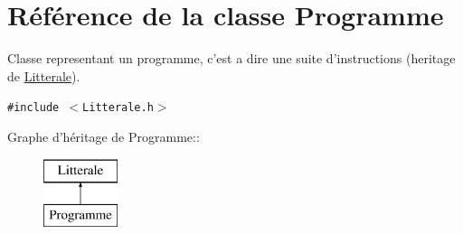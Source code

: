\hypertarget{class_programme}{
\section{Référence de la classe Programme}
\label{class_programme}
}
Classe representant un programme, c'est a dire une suite d'instructions (heritage de \hyperlink{class_litterale}{Litterale}).  


{\tt \#include $<$Litterale.h$>$}

Graphe d'héritage de Programme::\begin{figure}[H]
\begin{center}
\leavevmode
\includegraphics[height=2cm]{class_programme}
\end{center}
\end{figure}
